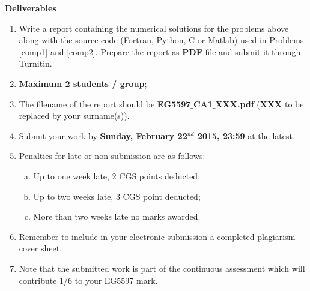 \documentclass[12pts,a4paper,amsmath,amssymb,floatfix]{article}%
\begin{document}
\bigskip

\begin{center}
{\bf Deliverables}
\end{center}

\begin{enumerate}
%
\item Write a report containing the numerical solutions for the problems above along with the source code (Fortran, Python, C or Matlab) used in Problems \ref{comp1} and \ref{comp2}. Prepare the report as {\bf PDF} file and submit it through Turnitin. 
%
\item {\bf Maximum 2 students / group};
%
\item The filename of the report should be {\bf EG5597$\_$CA1$\_$XXX.pdf} ({\bf XXX} to be replaced by your surname(s)).
%
\item Submit your work by {\bf Sunday,  February 22$^{nd}$ 2015, 23:59} at the latest. 
%
\item Penalties for late or non-submission are as follows: 
\begin{enumerate}[(a)]
\item Up to one week late, 2 CGS points deducted;
\item Up to two weeks late, 3 CGS point deducted;
\item More than two weeks late no marks awarded.
\end{enumerate}
%
\item Remember to include in your electronic submission a completed plagiarism cover sheet. 
%
\item Note that the submitted work is part of the continuous assessment which will contribute 1/6 to your EG5597 mark.
%
\end{enumerate}
%


\clearpage
\end{document}
